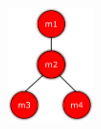 \begin{figure}[t]
\centering
\ffigbox
{
  \begin{subfloatrow}[3]
  \ffigbox[\FBwidth]
    {\caption{}\label{listings:graph-source}}
    {}
  \hspace{2em}%
  \ffigbox[\FBwidth]
    {\caption{}\label{listings:graph-tree}}
    {\includegraphics[width=0.2\textwidth]{images/tree.pdf}}
  \hspace{2em}%
  \ffigbox[\FBwidth]
    {\caption{}\label{listings:graph-graph}}

\end{subfloatrow}}
\end{figure}

